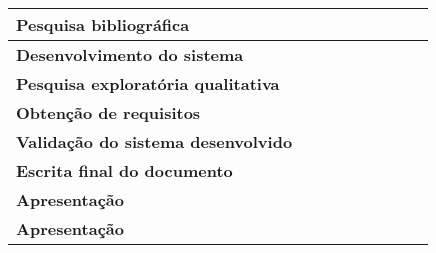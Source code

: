 \begin{table}[H]
{\begin{tabular}{@{}l|l|l|l|l|l|l|l|l|@{}}
      \multicolumn{1}{|l|}{\textbf{Pesquisa bibliográfica}}            & \cellcolor[HTML]{A4C2F4} & \cellcolor[HTML]{A4C2F4} & \cellcolor[HTML]{A4C2F4} &                          &                          &                          &                          &                          \\ \midrule
      \multicolumn{1}{|l|}{\textbf{Desenvolvimento do sistema}}        & \cellcolor[HTML]{A4C2F4} & \cellcolor[HTML]{A4C2F4} & \cellcolor[HTML]{A4C2F4} & \cellcolor[HTML]{A4C2F4} & \cellcolor[HTML]{A4C2F4} & \cellcolor[HTML]{A4C2F4} & \cellcolor[HTML]{A4C2F4} &                          \\ \midrule
      \multicolumn{1}{|l|}{\textbf{Pesquisa exploratória qualitativa}} &                          & \cellcolor[HTML]{A4C2F4} & \cellcolor[HTML]{A4C2F4} & \cellcolor[HTML]{A4C2F4} &                          &                          &                          &                          \\ \midrule
      \multicolumn{1}{|l|}{\textbf{Obtenção de requisitos}}            &                          & \cellcolor[HTML]{A4C2F4} & \cellcolor[HTML]{A4C2F4} & \cellcolor[HTML]{A4C2F4} &                          &                          &                          &                          \\ \midrule
      \multicolumn{1}{|l|}{\textbf{Validação do sistema desenvolvido}} &                          &                          & \cellcolor[HTML]{A4C2F4} & \cellcolor[HTML]{A4C2F4} & \cellcolor[HTML]{A4C2F4} & \cellcolor[HTML]{A4C2F4} & \cellcolor[HTML]{A4C2F4} &                          \\ \midrule
      \multicolumn{1}{|l|}{\textbf{Escrita final do documento}}        &                          &                          &                          &                          &                          &                          & \cellcolor[HTML]{A4C2F4} & \cellcolor[HTML]{A4C2F4} \\ \midrule
      \multicolumn{1}{|l|}{\textbf{Apresentação}}                      &                          &                          &                          &                          &                          &                          &                          & \cellcolor[HTML]{A4C2F4} \\ \midrule
      \multicolumn{1}{|l|}{\textbf{Apresentação}}                      &                          &                          &                          &                          &                          &                          &                          & \cellcolor[HTML]{A4C2F4} \\ \bottomrule
    \end{tabular} }
\end{table}